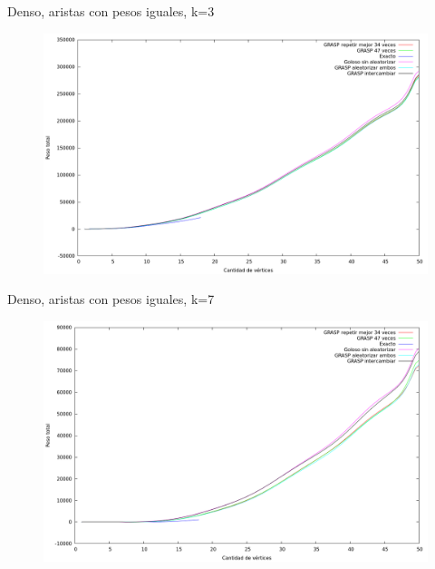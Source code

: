 \vspace*{0.5cm}

Denso, aristas con pesos iguales, k=3
\vspace*{0.5cm}

\begin{figure}[h]
  \begin{center}
    \includegraphics[scale=0.35]{imagenes/ej6-denso-pesos-iguales-k3-peso.png}
  \end{center}
\end{figure}

\vspace*{0.5cm}

Denso, aristas con pesos iguales, k=7
\vspace*{0.5cm}

\begin{figure}[h]
  \begin{center}
    \includegraphics[scale=0.35]{imagenes/ej6-denso-pesos-iguales-k7-peso.png}
  \end{center}
\end{figure}

